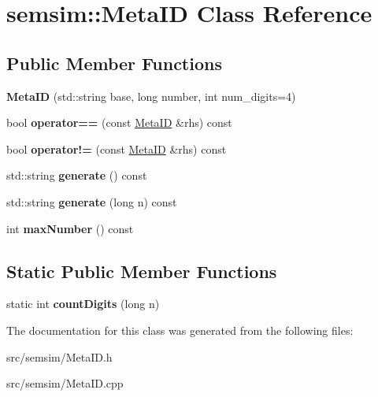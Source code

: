 \hypertarget{classsemsim_1_1MetaID}{}\section{semsim\+:\+:Meta\+ID Class Reference}
\label{classsemsim_1_1MetaID}
\subsection*{Public Member Functions}
\begin{DoxyCompactItemize}
\item 
\mbox{\label{classsemsim_1_1MetaID_a63833c9ae3303f451181f9d118c0d51c}} 
{\bfseries Meta\+ID} (std\+::string base, long number, int num\+\_\+digits=4)
\item 
\mbox{\label{classsemsim_1_1MetaID_a4b39fce25e5db81fdd59cfbc4f4734da}} 
bool {\bfseries operator==} (const \hyperlink{classsemsim_1_1MetaID}{Meta\+ID} \&rhs) const
\item 
\mbox{\label{classsemsim_1_1MetaID_a128d53d2d266cf1f88ef13ee9c21a2c0}} 
bool {\bfseries operator!=} (const \hyperlink{classsemsim_1_1MetaID}{Meta\+ID} \&rhs) const
\item 
\mbox{\label{classsemsim_1_1MetaID_aefd0d224e3930da32f927a4ff8c8bc74}} 
std\+::string {\bfseries generate} () const
\item 
\mbox{\label{classsemsim_1_1MetaID_a6336339cef2d12f7eea49bab94e45171}} 
std\+::string {\bfseries generate} (long n) const
\item 
\mbox{\label{classsemsim_1_1MetaID_a2a9408d835ed445a90b43843404e9fbe}} 
int {\bfseries max\+Number} () const
\end{DoxyCompactItemize}
\subsection*{Static Public Member Functions}
\begin{DoxyCompactItemize}
\item 
\mbox{\label{classsemsim_1_1MetaID_aa4f326f8b965d3dd7af038793e7806ad}} 
static int {\bfseries count\+Digits} (long n)
\end{DoxyCompactItemize}


The documentation for this class was generated from the following files\+:\begin{DoxyCompactItemize}
\item 
src/semsim/Meta\+I\+D.\+h\item 
src/semsim/Meta\+I\+D.\+cpp\end{DoxyCompactItemize}
